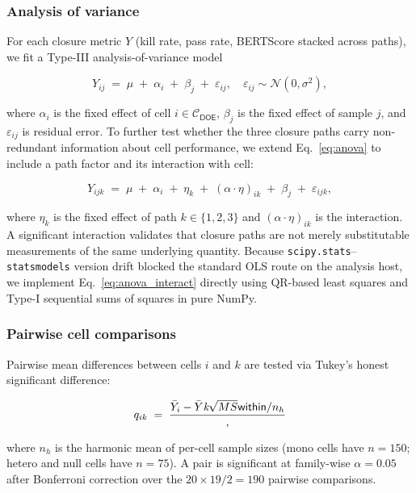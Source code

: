 \subsubsection{Analysis of variance}

For each closure metric $Y$ (kill rate, pass rate, BERTScore stacked across paths), we fit a Type-III analysis-of-variance model

\begin{equation}
  Y_{ij} \;=\; \mu \;+\; \alpha_i \;+\; \beta_j \;+\; \varepsilon_{ij},
  \quad \varepsilon_{ij} \sim \mathcal{N}(0, \sigma^2),
  \label{eq:anova}
\end{equation}

where $\alpha_i$ is the fixed effect of cell $i \in \mathcal{C}_{\textsf{DOE}}$, $\beta_j$ is the fixed effect of sample $j$, and $\varepsilon_{ij}$ is residual error. To further test whether the three closure paths carry non-redundant information about cell performance, we extend Eq.~\ref{eq:anova} to include a path factor and its interaction with cell:

\begin{equation}
  Y_{ijk} \;=\; \mu \;+\; \alpha_i \;+\; \eta_k \;+\; (\alpha \cdot \eta)_{ik} \;+\; \beta_j \;+\; \varepsilon_{ijk},
  \label{eq:anova_interact}
\end{equation}

where $\eta_k$ is the fixed effect of path $k \in \{1, 2, 3\}$ and $(\alpha \cdot \eta)_{ik}$ is the interaction. A significant interaction validates that closure paths are not merely substitutable measurements of the same underlying quantity. Because \texttt{scipy.stats}--\texttt{statsmodels} version drift blocked the standard OLS route on the analysis host, we implement Eq.~\ref{eq:anova_interact} directly using QR-based least squares and Type-I sequential sums of squares in pure NumPy.

\subsubsection{Pairwise cell comparisons}

Pairwise mean differences between cells $i$ and $k$ are tested via Tukey's honest significant difference:

\begin{equation}
  q_{ik}
  \;=\;
  \frac{\bar{Y}_i - \bar{Y}\emph{k}{\sqrt{MS}{\textsf{within}} / n_h}},
  \label{eq:tukey}
\end{equation}

where $n_h$ is the harmonic mean of per-cell sample sizes (mono cells have $n = 150$; hetero and null cells have $n = 75$). A pair is significant at family-wise $\alpha = 0.05$ after Bonferroni correction over the $20 \times 19 / 2 = 190$ pairwise comparisons.

